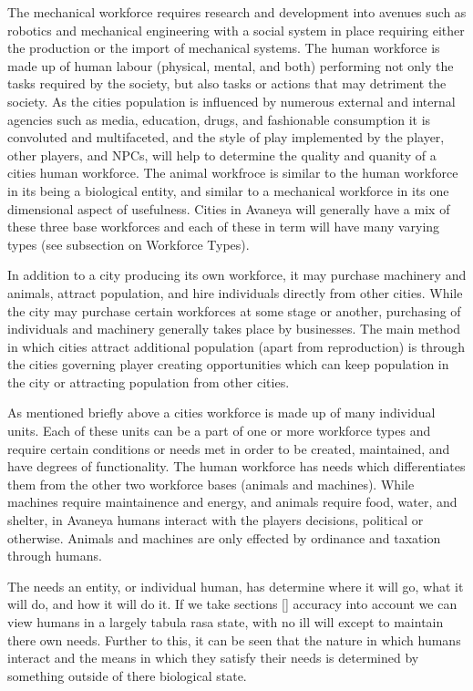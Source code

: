 The mechanical workforce requires research and development into avenues such as robotics and mechanical engineering with a social system in place requiring either the production or the import of mechanical systems. The human workforce is made up of human labour (physical, mental, and both) performing not only the tasks required by the society, but also tasks or actions that may detriment the society. As the cities population is influenced by numerous external and internal agencies such as media, education, drugs, and fashionable consumption it is convoluted and multifaceted, and the style of play implemented by the player, other players, and NPCs, will help to determine the quality and quanity of a cities human workforce. The animal workfroce is similar to the human workforce in its being a biological entity, and similar to a mechanical workforce in its one dimensional aspect of usefulness. Cities in Avaneya will generally have a mix of these three base workforces and each of these in term will have many varying types (see subsection on Workforce Types). 

In addition to a city producing its own workforce, it may purchase machinery and animals, attract population, and hire individuals directly from other cities. While the city may purchase certain workforces at some stage or another, purchasing of individuals and machinery generally takes place by businesses. The main method in which cities attract additional population (apart from reproduction) is through the cities governing player creating opportunities which can keep population in the city or attracting population from other cities. 


As mentioned briefly above a cities workforce is made up of many individual units. Each of these units can be a part of one or more workforce types and require certain conditions or needs met in order to be created, maintained, and have degrees of functionality. The human workforce has needs which differentiates them from the other two workforce bases (animals and machines). While machines require maintainence and energy, and animals require food, water, and shelter, in Avaneya humans interact with the players decisions, political or otherwise. Animals and machines are only effected by ordinance and taxation through humans. 

The needs an entity, or individual human, has determine where it will go, what it will do, and how it will do it. If we take sections [] accuracy into account we can view humans in a largely tabula rasa state, with no ill will except to maintain there own needs. Further to this, it can be seen that the nature in which humans interact and the means in which they satisfy their needs is determined by something outside of there biological state. 

